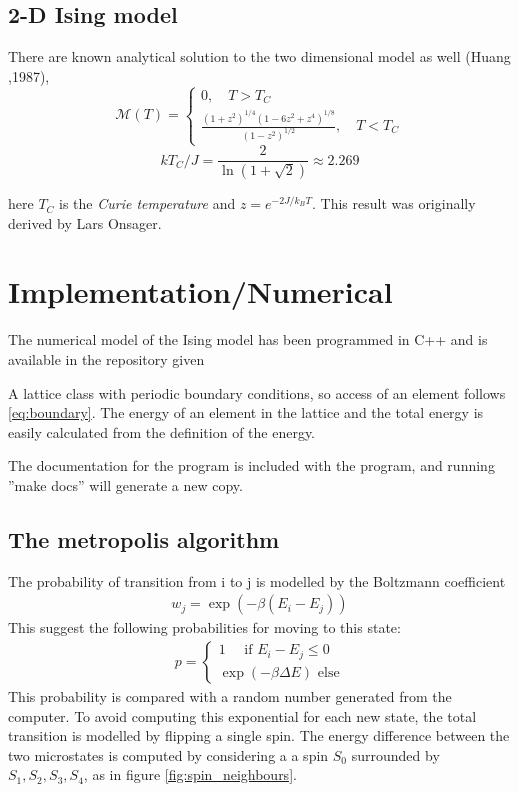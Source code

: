 \documentclass[11pt,a4paper,english]{article}
\numberwithin{equation}{section}
\newcommand{\magM}{\mathcal{M}}
\begin{document}
\subsection{2-D Ising model}
There are known analytical solution to the two dimensional model as well (Huang ,1987),
\begin{equation}
\magM (T) = \begin{cases} 0, \quad T > T_C \\ \frac{(1+z^2)^{1/4} (1-6z^2 + z^4 )^{1/8} }{(1-z^2)^{1/2}}, \quad T < T_C \end{cases}
\end{equation}
\begin{equation}
k T_C/J = \frac{2}{\ln(1+ \sqrt{2}) } \approx 2.269
\end{equation}

here $T_C$ is the \emph{Curie temperature} and $z = e^{-2J/k_B T}$. This result was originally derived by Lars Onsager.

\section{Implementation/Numerical}

The numerical model of the Ising model has been programmed in C++ and is 
available in the repository given 

A lattice class with periodic boundary conditions, so access of an
element follows \eqref{eq:boundary}. The energy of an element in the 
lattice and the total energy is easily calculated from the definition
of the energy. 

The documentation for the program is included with the program, and 
running ''make docs'' will generate a new copy.

\subsection{The metropolis algorithm}

The probability of transition from i to j 
is modelled by the Boltzmann coefficient
\begin{gather}
w_j = \exp(-\beta (E_i - E_j))
\end{gather}
This suggest the following probabilities for moving to this state:
\begin{gather}
p = \begin{cases}
1 \quad\text{ if }  E_i - E_j \le 0\\
\exp(-\beta \Delta E) \text{ else}
\end{cases}
\label{eq:transition}
\end{gather}
This probability is compared with a random number generated from 
the computer. To avoid computing this exponential for each new state,
the total transition is modelled by flipping a single spin. The energy 
difference between the two microstates is computed by considering 
a a spin $S_0$ surrounded by $S_1,S_2,S_3, S_4$, as in figure 
\ref{fig:spin_neighbours}.
\end{document}
